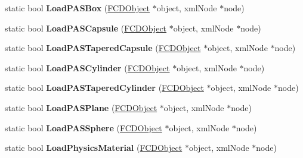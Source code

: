 \begin{DoxyCompactItemize}
\item 
\hypertarget{classFArchiveXML_af63374014ddf15b1dd31975596f1ced3}{
static bool {\bfseries LoadPASBox} (\hyperlink{classFCDObject}{FCDObject} $\ast$object, xmlNode $\ast$node)}
\label{classFArchiveXML_af63374014ddf15b1dd31975596f1ced3}

\item 
\hypertarget{classFArchiveXML_a223c29850e37f72af05c3d66dc28a978}{
static bool {\bfseries LoadPASCapsule} (\hyperlink{classFCDObject}{FCDObject} $\ast$object, xmlNode $\ast$node)}
\label{classFArchiveXML_a223c29850e37f72af05c3d66dc28a978}

\item 
\hypertarget{classFArchiveXML_aabd1fd0875ffaf8ef6fb0689d37e81cf}{
static bool {\bfseries LoadPASTaperedCapsule} (\hyperlink{classFCDObject}{FCDObject} $\ast$object, xmlNode $\ast$node)}
\label{classFArchiveXML_aabd1fd0875ffaf8ef6fb0689d37e81cf}

\item 
\hypertarget{classFArchiveXML_a590ab8128ebf104f25968fc1c76dcda1}{
static bool {\bfseries LoadPASCylinder} (\hyperlink{classFCDObject}{FCDObject} $\ast$object, xmlNode $\ast$node)}
\label{classFArchiveXML_a590ab8128ebf104f25968fc1c76dcda1}

\item 
\hypertarget{classFArchiveXML_ae33494b0714790692fdcc31195bb64c0}{
static bool {\bfseries LoadPASTaperedCylinder} (\hyperlink{classFCDObject}{FCDObject} $\ast$object, xmlNode $\ast$node)}
\label{classFArchiveXML_ae33494b0714790692fdcc31195bb64c0}

\item 
\hypertarget{classFArchiveXML_ae534146f87505d3702730261a143ffb4}{
static bool {\bfseries LoadPASPlane} (\hyperlink{classFCDObject}{FCDObject} $\ast$object, xmlNode $\ast$node)}
\label{classFArchiveXML_ae534146f87505d3702730261a143ffb4}

\item 
\hypertarget{classFArchiveXML_a2f2b3f695d4cafb82c1107a450736f23}{
static bool {\bfseries LoadPASSphere} (\hyperlink{classFCDObject}{FCDObject} $\ast$object, xmlNode $\ast$node)}
\label{classFArchiveXML_a2f2b3f695d4cafb82c1107a450736f23}

\item 
\hypertarget{classFArchiveXML_abbc224a6cb3d7c5445358199fe5f587f}{
static bool {\bfseries LoadPhysicsMaterial} (\hyperlink{classFCDObject}{FCDObject} $\ast$object, xmlNode $\ast$node)}
\label{classFArchiveXML_abbc224a6cb3d7c5445358199fe5f587f}


\end{DoxyCompactItemize}
